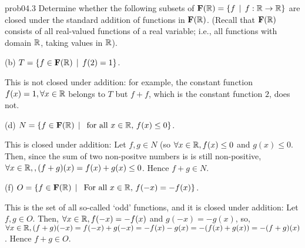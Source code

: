 \begin{sol}{prob04.3}  Determine whether   the following subsets of $\mathbf{F}(\mathbb{R})=\{f \,\mid \, f: \mathbb{R} \to \mathbb{R} \}$ are closed under the standard addition of functions in  $\mathbf{F}(\mathbb{R})$. (Recall that $\mathbf{F}(\mathbb{R})$ consists of all real-valued functions of a real variable; i.e., all functions with domain $\mathbb{R}$, taking values in $\mathbb{R}$). 
 \medskip
 
(b) $T=\{f \in \mathbf{F}(\mathbb{R}) \,\mid \, f(2)=1  \}$. 

\soln This is not closed under addition: for example, the constant function $f(x)=1, \forall x\in \mathbb{R}$ belongs to $T$ but $f+f$, which is the constant function $2$, does not.
\medskip  



(d)  $N=\{f \in \mathbf{F}(\mathbb{R}) \,\mid \, \text{ for all } x\in \mathbb{R},   \, f(x)\le 0 \}$. 

\soln This is closed under addition: Let $f, g \in N$ (so $\forall x \in \mathbb{R}, f(x)\le 0$ and $g(x)\le 0$. Then,  since the sum of two non-positve numbers is is still non-positive,  $\forall x \in \mathbb{R},, (f+g)(x)= f(x)+g(x)\le 0$. Hence $f+g\in N$.\medskip 
%



(f) $O=\{f \in \mathbf{F}(\mathbb{R}) \,\mid \, \text{ For all } x\in \mathbb{R},   \, f(-x)= -f(x) \}$. 

\soln This is the set of all so-called `odd' functions, and it is closed under addition: Let $f,g \in O$. Then, $\forall x \in \mathbb{R}, f(-x)= -f(x)$ and $g(-x)= -g(x)$, so, $\forall x \in \mathbb{R}, (f+g)(-x)=f(-x)+g(-x)=-f(x)-g(x)=-(f(x)+g(x))=-(f+g)(x)$. Hence $f+g\in O$.\medskip 
%


\end{sol} 

